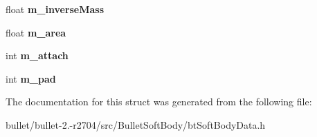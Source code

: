 \begin{DoxyCompactItemize}
\item 
\hypertarget{struct_soft_body_node_data_a4d3926ca40971d11a4cb9f6839622682}{float {\bfseries m\+\_\+inverse\+Mass}}\label{struct_soft_body_node_data_a4d3926ca40971d11a4cb9f6839622682}

\item 
\hypertarget{struct_soft_body_node_data_a009ecbfaab4325952b028b88a70c6271}{float {\bfseries m\+\_\+area}}\label{struct_soft_body_node_data_a009ecbfaab4325952b028b88a70c6271}

\item 
\hypertarget{struct_soft_body_node_data_acf4ecf747225f90a77f19a9fbf10693a}{int {\bfseries m\+\_\+attach}}\label{struct_soft_body_node_data_acf4ecf747225f90a77f19a9fbf10693a}

\item 
\hypertarget{struct_soft_body_node_data_af2f26538337d7f07465ce37c6c73cc86}{int {\bfseries m\+\_\+pad}}\label{struct_soft_body_node_data_af2f26538337d7f07465ce37c6c73cc86}

\end{DoxyCompactItemize}


The documentation for this struct was generated from the following file\+:\begin{DoxyCompactItemize}
\item 
bullet/bullet-\/2.-\/r2704/src/\+Bullet\+Soft\+Body/bt\+Soft\+Body\+Data.\+h\end{DoxyCompactItemize}
